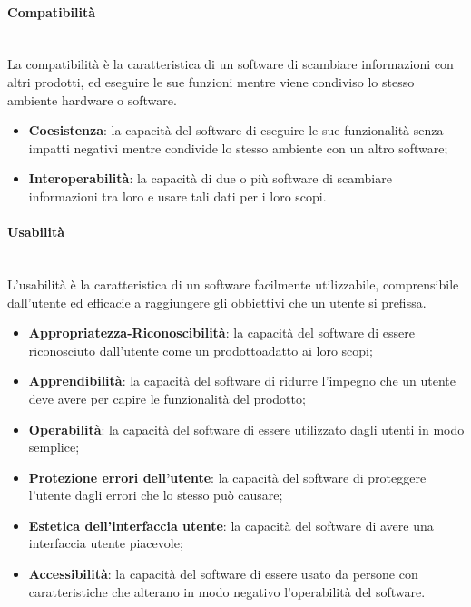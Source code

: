 	\paragraph{Compatibilità} \mbox{}\\
	La compatibilità è la caratteristica di un software di scambiare informazioni con altri prodotti, ed eseguire le sue funzioni mentre viene condiviso lo stesso ambiente hardware o software.
	\begin{itemize}
		\item \textbf{Coesistenza}: la capacità del software di eseguire le sue funzionalità senza impatti negativi mentre condivide lo stesso ambiente con un altro software;
		\item \textbf{Interoperabilità}: la capacità di due o più software di scambiare informazioni tra loro e usare tali dati per i loro scopi.
	\end{itemize}
	\paragraph{Usabilità} \mbox{}\\
	L'usabilità è la caratteristica di un software facilmente utilizzabile, comprensibile dall'utente ed efficacie a raggiungere gli obbiettivi che un utente si prefissa.
	\begin{itemize}
		\item \textbf{Appropriatezza-Riconoscibilità}: la capacità del software di essere riconosciuto dall'utente come un prodotto\glosp adatto ai loro scopi;
		\item \textbf{Apprendibilità}: la capacità del software di ridurre l'impegno che un utente deve avere per capire le funzionalità del prodotto\glo ;
		\item \textbf{Operabilità}: la capacità del software di essere utilizzato dagli utenti in modo semplice;
		\item \textbf{Protezione errori dell'utente}: la capacità del software di proteggere l'utente dagli errori che lo stesso può causare;
		\item \textbf{Estetica dell'interfaccia utente}: la capacità del software di avere una interfaccia utente piacevole;
		\item \textbf{Accessibilità}: la capacità del software di essere usato da persone con caratteristiche che alterano in modo negativo l'operabilità del software.
	\end{itemize}

